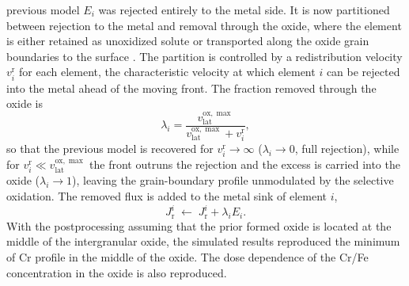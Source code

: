 \documentclass[12pt]{article}
\newcommand{\lat}{\mathrm{lat}}
\newcommand{\ox}{\mathrm{ox}}
\begin{document}
previous model $E_i$ was rejected entirely to the metal side. It is now partitioned
between rejection to the metal and removal through the oxide, where the element is
either retained as unoxidized solute or transported along the oxide grain boundaries
to the surface \cite{deng2020corrosion}. The partition is controlled by a
redistribution velocity $v_i^{\mathrm{r}}$ for each element, the characteristic
velocity at which element $i$ can be rejected into the metal ahead of the moving
front. The fraction removed through the oxide is
\begin{equation}
\lambda_i=\frac{v_{\lat}^{\ox,\max}}{v_{\lat}^{\ox,\max}+v_i^{\mathrm{r}}},
\label{eq:capture-fraction}
\end{equation}
so that the previous model is recovered for $v_i^{\mathrm{r}}\to\infty$
($\lambda_i\to0$, full rejection), while for $v_i^{\mathrm{r}}\ll v_{\lat}^{\ox,\max}$
the front outruns the rejection and the excess is carried into the oxide
($\lambda_i\to1$), leaving the grain-boundary profile unmodulated by the selective
oxidation. The removed flux is added to the metal sink of element $i$,
\begin{equation}
J_{\mathrm{r}}^{i}\;\leftarrow\;J_{\mathrm{r}}^{i}+\lambda_i E_i .
\label{eq:sink-capture}
\end{equation}
With the postprocessing assuming that the prior formed oxide is located at the middle of the intergranular oxide, the simulated results reproduced the minimum of Cr profile in the middle of the oxide. The dose dependence of the Cr/Fe concentration in the oxide is also reproduced.
\end{document}
